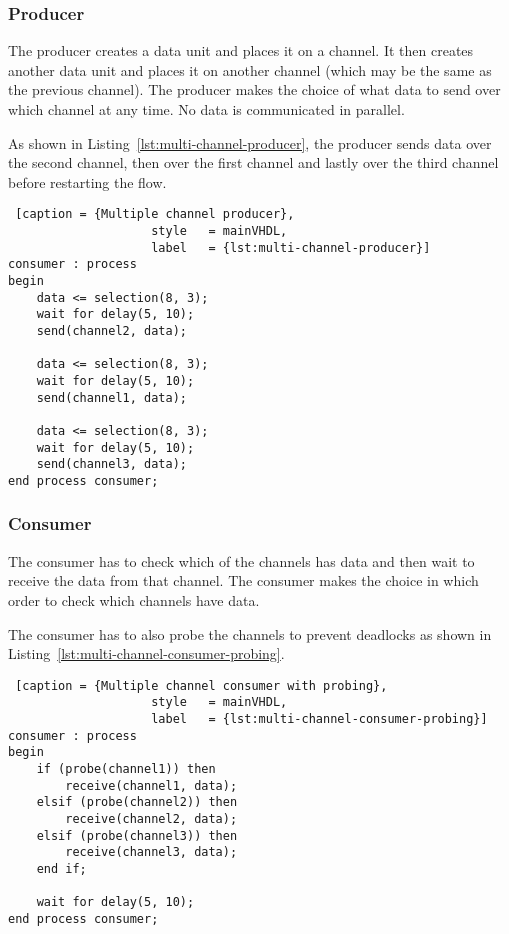 \documentclass{report}
\begin{document}
\subsubsection{Producer}

The producer creates a data unit and places it on a channel. It then creates
another data unit and places it on another channel (which may be the same as the
previous channel). The producer makes the choice of what data to send over which
channel at any time. No data is communicated in parallel.

As shown in Listing~\ref{lst:multi-channel-producer}, the producer sends data
over the second channel, then over the first channel and lastly over the third
channel before restarting the flow.

\begin{lstlisting} [caption = {Multiple channel producer},
                    style   = mainVHDL,
                    label   = {lst:multi-channel-producer}]
consumer : process
begin
    data <= selection(8, 3);
    wait for delay(5, 10);
    send(channel2, data);

    data <= selection(8, 3);
    wait for delay(5, 10);
    send(channel1, data);

    data <= selection(8, 3);
    wait for delay(5, 10);
    send(channel3, data);
end process consumer;

\end{lstlisting}

\subsubsection{Consumer}

The consumer has to check which of the channels has data and then wait to
receive the data from that channel. The consumer makes the choice in which order
to check which channels have data.

The consumer has to also probe the channels to prevent deadlocks as shown in
Listing~\ref{lst:multi-channel-consumer-probing}.

\begin{lstlisting} [caption = {Multiple channel consumer with probing},
                    style   = mainVHDL,
                    label   = {lst:multi-channel-consumer-probing}]
consumer : process
begin
    if (probe(channel1)) then
        receive(channel1, data);
    elsif (probe(channel2)) then
        receive(channel2, data);
    elsif (probe(channel3)) then
        receive(channel3, data);
    end if;

    wait for delay(5, 10);
end process consumer;

\end{lstlisting}
\end{document}
